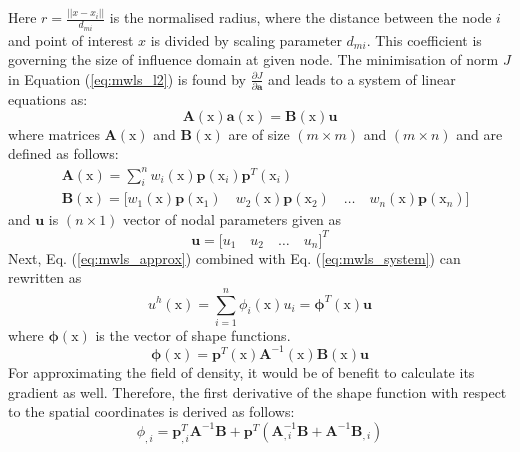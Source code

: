 \documentclass[11pt]{ACMEarticle}
\numberwithin{equation}{section}
\begin{document}
Here $r = \frac{||x-x_i||}{d_{mi}} $ is the normalised radius, where the distance between the node $i$  and point of interest $x$ is divided by scaling parameter $d_{mi}$. This coefficient is governing the size of influence domain at given node. 
The minimisation of norm $J$ in Equation (\ref{eq:mwls_l2}) is found by $\frac{\partial J}{\partial \mathbf a}$ and leads to a system of linear equations as:
\begin{equation}
\mathbf{ { A }} (\mathrm x) \mathbf{ { a}} (\mathrm x) = \mathbf{ { B }}(\mathrm x) \mathbf{ { u}}
\end{equation} \label{eq:mwls_system}
where matrices $\mathbf{ { A }}(\mathrm x)$ and \textbf{$\mathbf{ { B}}(\mathrm x)$} are of size $(m \times m )$ and $(m \times n )$ and are defined as follows:
\begin{equation} 
\begin{aligned}
& \mathbf{ { A }}(\mathrm x) = \sum_i^n w_i (\mathrm x)\mathbf{p} (\mathrm  x_i)\mathbf p^T (\mathrm x_i) \\
& \mathbf{ { B }}(\mathrm x) = \Big[   w_1(\mathrm x) \mathbf p (\mathrm x_1) \quad w_2(\mathrm x) \mathbf p (\mathrm x_2) \quad \dots \quad  w_n(\mathrm x) \mathbf p (\mathrm x_n)  \Big]
\end{aligned}
\end{equation}
and $\mathbf u$ is $(n \times 1)$ vector of nodal parameters given as 
\begin{equation}
\mathbf u = \big[ u_1 \quad u_2 \quad \dots \quad u_n \big]^T
\end{equation}
Next, Eq. (\ref{eq:mwls_approx}) combined with Eq. (\ref{eq:mwls_system}) can rewritten as 
\begin{equation}
u^h(\mathrm{ x} )=\sum^n_{i=1} \phi_i(\mathrm{ x} ) u_i = \mathbf \phi^T (\mathrm x) \mathbf u
\end{equation}
where $ \mathbf \phi (\mathrm x)$ is the vector of shape functions.
\begin{equation}
\mathbf \phi (\mathrm x) = \mathbf p^T (\mathrm x) \mathbf{A}^{-1} (\mathrm x) \mathbf B (\mathrm x) \mathbf u
\end{equation}
For approximating the field of density, it would be of benefit to calculate its gradient as well. Therefore, the first derivative of the shape function with respect to the spatial coordinates is derived as follows: 
\begin{equation}
\phi_{,i} = \mathbf p^T_{,i} \mathbf A^{-1} \mathbf B + \mathbf p^T ( \mathbf A_{,i}^{-1} \mathbf B + \mathbf A^{-1} \mathbf B_{,i} )
\end{equation}
\end{document}
